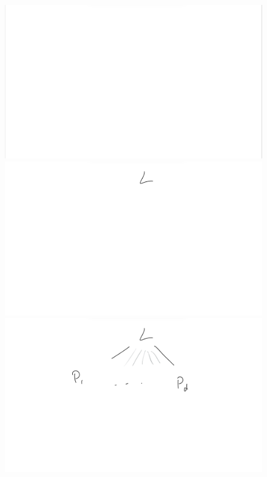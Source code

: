 \documentclass{beamer}[10]
\begin{document}
\begin{frame}
        \begin{figure}
            \begin{overprint}
                \centering\includegraphics[scale=0.2]{Step0.PNG}
                \centering\includegraphics[scale=0.2]{Step1.PNG}
                \centering\includegraphics[scale=0.2]{Step2.PNG}

\end{overprint}
\end{figure}
\end{frame}
\end{document}
